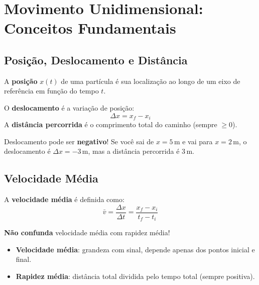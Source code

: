 \documentclass[10.5pt, a4paper]{extarticle}
\begin{document}
\pagecolor{white}\color{black}


\tableofcontents
\newpage

\section{Movimento Unidimensional: Conceitos Fundamentais}

\subsection{Posição, Deslocamento e Distância}

\begin{definicaobox}
A \textbf{posição} $x(t)$ de uma partícula é sua localização ao longo de um eixo de referência em função do tempo $t$.

O \textbf{deslocamento} é a variação de posição:
\[
  \Delta x = x_f - x_i
\]
A \textbf{distância percorrida} é o comprimento total do caminho (sempre $\geq 0$).
\end{definicaobox}

\begin{pikabox}
Deslocamento pode ser \textbf{negativo}! Se você sai de $x=5\,\text{m}$ e vai para $x=2\,\text{m}$, o deslocamento é $\Delta x = -3\,\text{m}$, mas a distância percorrida é $3\,\text{m}$.
\end{pikabox}

\subsection{Velocidade Média}

A \textbf{velocidade média} é definida como:
\[
  \bar{v} = \frac{\Delta x}{\Delta t} = \frac{x_f - x_i}{t_f - t_i}
\]

\begin{charmanderbox}
\textbf{Não confunda} velocidade média com rapidez média!
\begin{itemize}[nosep]
  \item \textbf{Velocidade média}: grandeza com sinal, depende apenas dos pontos inicial e final.
  \item \textbf{Rapidez média}: distância total dividida pelo tempo total (sempre positiva).
\end{itemize}
\end{charmanderbox}
\end{document}
